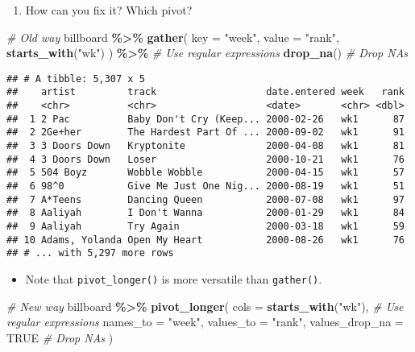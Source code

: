 \documentclass[
]{book}
\newenvironment{Shaded}{\begin{snugshade}}{\end{snugshade}}
\newcommand{\CommentTok}[1]{\textcolor[rgb]{0.56,0.35,0.01}{\textit{#1}}}
\newcommand{\DataTypeTok}[1]{\textcolor[rgb]{0.13,0.29,0.53}{#1}}
\newcommand{\KeywordTok}[1]{\textcolor[rgb]{0.13,0.29,0.53}{\textbf{#1}}}
\newcommand{\NormalTok}[1]{#1}
\newcommand{\OperatorTok}[1]{\textcolor[rgb]{0.81,0.36,0.00}{\textbf{#1}}}
\newcommand{\OtherTok}[1]{\textcolor[rgb]{0.56,0.35,0.01}{#1}}
\newcommand{\StringTok}[1]{\textcolor[rgb]{0.31,0.60,0.02}{#1}}
\providecommand{\tightlist}{%
  \setlength{\itemsep}{0pt}\setlength{\parskip}{0pt}}
\begin{document}
\begin{enumerate}
\def\labelenumi{\arabic{enumi}.}
\setcounter{enumi}{1}
\tightlist
\item
  How can you fix it? Which pivot?
\end{enumerate}

\begin{Shaded}
\begin{Highlighting}[]
\CommentTok{\# Old way}
\NormalTok{billboard }\OperatorTok{\%\textgreater{}\%}
\StringTok{  }\KeywordTok{gather}\NormalTok{(}
    \DataTypeTok{key =} \StringTok{"week"}\NormalTok{,}
    \DataTypeTok{value =} \StringTok{"rank"}\NormalTok{,}
    \KeywordTok{starts\_with}\NormalTok{(}\StringTok{"wk"}\NormalTok{)}
\NormalTok{  ) }\OperatorTok{\%\textgreater{}\%}\StringTok{ }\CommentTok{\# Use regular expressions}
\StringTok{  }\KeywordTok{drop\_na}\NormalTok{() }\CommentTok{\# Drop NAs}
\end{Highlighting}
\end{Shaded}

\begin{verbatim}
## # A tibble: 5,307 x 5
##    artist         track                   date.entered week   rank
##    <chr>          <chr>                   <date>       <chr> <dbl>
##  1 2 Pac          Baby Don't Cry (Keep... 2000-02-26   wk1      87
##  2 2Ge+her        The Hardest Part Of ... 2000-09-02   wk1      91
##  3 3 Doors Down   Kryptonite              2000-04-08   wk1      81
##  4 3 Doors Down   Loser                   2000-10-21   wk1      76
##  5 504 Boyz       Wobble Wobble           2000-04-15   wk1      57
##  6 98^0           Give Me Just One Nig... 2000-08-19   wk1      51
##  7 A*Teens        Dancing Queen           2000-07-08   wk1      97
##  8 Aaliyah        I Don't Wanna           2000-01-29   wk1      84
##  9 Aaliyah        Try Again               2000-03-18   wk1      59
## 10 Adams, Yolanda Open My Heart           2000-08-26   wk1      76
## # ... with 5,297 more rows
\end{verbatim}

\begin{itemize}
\tightlist
\item
  Note that \texttt{pivot\_longer()} is more versatile than \texttt{gather()}.
\end{itemize}

\begin{Shaded}
\begin{Highlighting}[]
\CommentTok{\# New way}
\NormalTok{billboard }\OperatorTok{\%\textgreater{}\%}
\StringTok{  }\KeywordTok{pivot\_longer}\NormalTok{(}
    \DataTypeTok{cols =} \KeywordTok{starts\_with}\NormalTok{(}\StringTok{"wk"}\NormalTok{), }\CommentTok{\# Use regular expressions}
    \DataTypeTok{names\_to =} \StringTok{"week"}\NormalTok{,}
    \DataTypeTok{values\_to =} \StringTok{"rank"}\NormalTok{,}
    \DataTypeTok{values\_drop\_na =} \OtherTok{TRUE} \CommentTok{\# Drop NAs}
\NormalTok{  )}
\end{Highlighting}
\end{Shaded}
\end{document}
